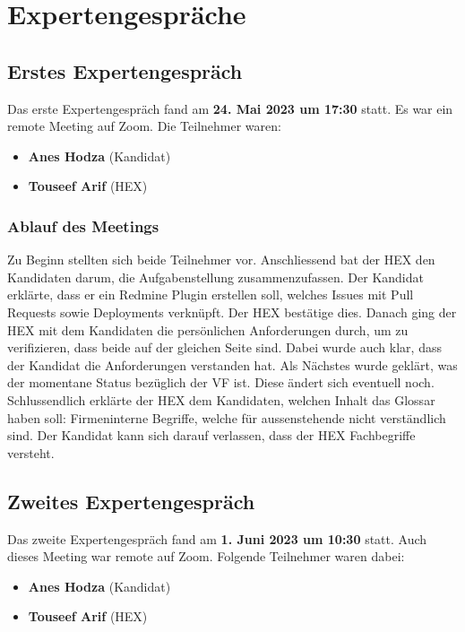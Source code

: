 \chapter{Expertengespräche}
\section{Erstes Expertengespräch}
\label{sec:first-expert-meeting}
Das erste Expertengespräch fand am \textbf{24. Mai 2023 um 17:30} statt. Es war ein remote Meeting auf Zoom.
Die Teilnehmer waren:
\begin{itemize}
  \item \textbf{Anes Hodza} (Kandidat)
  \item \textbf{Touseef Arif} (HEX)
\end{itemize}

\subsection{Ablauf des Meetings}
Zu Beginn stellten sich beide Teilnehmer vor. Anschliessend bat der HEX den Kandidaten darum, die Aufgabenstellung
zusammenzufassen. Der Kandidat erklärte, dass er ein Redmine Plugin erstellen soll, welches \gls{Issue}s mit Pull Requests
sowie Deployments verknüpft. Der HEX bestätige dies. \newline
Danach ging der HEX mit dem Kandidaten die persönlichen Anforderungen durch, um zu verifizieren, dass beide auf der
gleichen Seite sind. Dabei wurde auch klar, dass der Kandidat die Anforderungen verstanden hat. \newline
Als Nächstes wurde geklärt, was der momentane Status bezüglich der VF ist. Diese ändert sich eventuell noch. \newline
Schlussendlich erklärte der HEX dem Kandidaten, welchen Inhalt das Glossar haben soll: Firmeninterne Begriffe, welche
für aussenstehende nicht verständlich sind. Der Kandidat kann sich darauf verlassen, dass der HEX Fachbegriffe
versteht.

\section{Zweites Expertengespräch}
\label{sec:second-expert-meeting}
Das zweite Expertengespräch fand am \textbf{1. Juni 2023 um 10:30} statt. Auch dieses Meeting war remote auf Zoom.
Folgende Teilnehmer waren dabei:
\begin{itemize}
  \item \textbf{Anes Hodza} (Kandidat)
  \item \textbf{Touseef Arif} (HEX)
\end{itemize}


